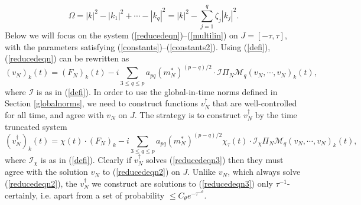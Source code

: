 \documentclass[11 pt,reqno]{amsart}
\theoremstyle{definition}
\theoremstyle{remark}
\numberwithin{equation}{section}
\newcommand{\Ic}{\mathcal{I}}
\renewcommand{\Mc}{\mathcal{M}}
\begin{document}
{\begin{equation}\label{defomega}\Omega=|k|^2-|k_1|^2+\cdots -|k_q|^2=|k|^2-\sum_{j=1}^q\zeta_j|k_j|^2.
\end{equation} Below we will focus on the system (\ref{reducedeqn})--(\ref{multilin}) on $J=[-\tau,\tau]$, with the parameters satisfying (\ref{constants})--(\ref{constants2}). Using (\ref{defi}), (\ref{reducedeqn}) can be rewritten as
 \begin{equation}\label{reducedeqn2}
 (v_N)_k(t)=(F_N)_k(t)-i\sum_{3\leq q\leq p}a_{pq}(m_N^*)^{(p-q)/2}\cdot\Ic\Pi_N\Mc_q(v_N,\cdots,v_N)_k(t),
 \end{equation} where $\Ic$ is as in (\ref{defi}). In order to use the global-in-time norms defined in Section \ref{globalnorms}, we need to construct functions $v_N^\dagger$ that are well-controlled for all time, and agree with $v_N$ on $J$. The strategy is to construct $v_N^\dagger$ by the time truncated system
  \begin{equation}\label{reducedeqn3}
 (v_N^\dagger)_k(t)=\chi(t)\cdot(F_N)_k-i\sum_{3\leq q\leq p}a_{pq}(m_N^*)^{(p-q)/2}\chi_\tau(t)\cdot\Ic_\chi\Pi_N\Mc_q(v_N,\cdots,v_N)_k(t),
 \end{equation} where $\Ic_\chi$ is as in (\ref{defi}). Clearly if $v_N^\dagger$ solves (\ref{reducedeqn3}) then they must agree with the solution $v_N$ to (\ref{reducedeqn2}) on $J$. Unlike $v_N$, which always solve (\ref{reducedeqn2}), the $v_N^\dagger$ we construct are solutions to (\ref{reducedeqn3}) only $\tau^{-1}$-certainly, i.e. apart from a set of probability $\leq C_\theta e^{-\tau^{-\theta}}$.
}
\end{document}
